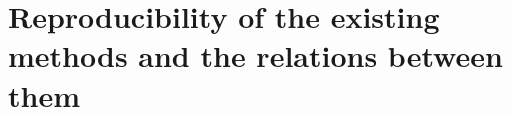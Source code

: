 \cleardoublepage
\part{Reproducibility of the existing methods and the relations between them}\label{part:part2}





\newpage

